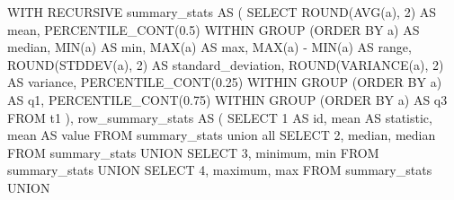 \documentclass[
  letterpaper,
  DIV=11,
  numbers=noendperiod]{scrreprt}
\newenvironment{Shaded}{\begin{snugshade}}{\end{snugshade}}
\newcommand{\DecValTok}[1]{\textcolor[rgb]{0.68,0.00,0.00}{#1}}
\newcommand{\FloatTok}[1]{\textcolor[rgb]{0.68,0.00,0.00}{#1}}
\newcommand{\FunctionTok}[1]{\textcolor[rgb]{0.28,0.35,0.67}{#1}}
\newcommand{\KeywordTok}[1]{\textcolor[rgb]{0.00,0.23,0.31}{#1}}
\newcommand{\NormalTok}[1]{\textcolor[rgb]{0.00,0.23,0.31}{#1}}
\newcommand{\OperatorTok}[1]{\textcolor[rgb]{0.37,0.37,0.37}{#1}}
\newcommand{\StringTok}[1]{\textcolor[rgb]{0.13,0.47,0.30}{#1}}
\begin{document}
\begin{Shaded}
\begin{Highlighting}[]
\KeywordTok{WITH}\NormalTok{ RECURSIVE}
\NormalTok{summary\_stats }\KeywordTok{AS}
\NormalTok{(}
 \KeywordTok{SELECT} 
  \FunctionTok{ROUND}\NormalTok{(}\FunctionTok{AVG}\NormalTok{(a), }\DecValTok{2}\NormalTok{) }\KeywordTok{AS}\NormalTok{ mean,}
  \FunctionTok{PERCENTILE\_CONT}\NormalTok{(}\FloatTok{0.5}\NormalTok{) WITHIN }\KeywordTok{GROUP}\NormalTok{ (}\KeywordTok{ORDER} \KeywordTok{BY}\NormalTok{ a) }\KeywordTok{AS} \FunctionTok{median}\NormalTok{,}
  \FunctionTok{MIN}\NormalTok{(a) }\KeywordTok{AS} \FunctionTok{min}\NormalTok{,}
  \FunctionTok{MAX}\NormalTok{(a) }\KeywordTok{AS} \FunctionTok{max}\NormalTok{,}
  \FunctionTok{MAX}\NormalTok{(a) }\OperatorTok{{-}} \FunctionTok{MIN}\NormalTok{(a) }\KeywordTok{AS} \KeywordTok{range}\NormalTok{,}
  \FunctionTok{ROUND}\NormalTok{(}\FunctionTok{STDDEV}\NormalTok{(a), }\DecValTok{2}\NormalTok{) }\KeywordTok{AS}\NormalTok{ standard\_deviation,}
  \FunctionTok{ROUND}\NormalTok{(}\FunctionTok{VARIANCE}\NormalTok{(a), }\DecValTok{2}\NormalTok{) }\KeywordTok{AS} \FunctionTok{variance}\NormalTok{,}
  \FunctionTok{PERCENTILE\_CONT}\NormalTok{(}\FloatTok{0.25}\NormalTok{) WITHIN }\KeywordTok{GROUP}\NormalTok{ (}\KeywordTok{ORDER} \KeywordTok{BY}\NormalTok{ a) }\KeywordTok{AS}\NormalTok{ q1,}
  \FunctionTok{PERCENTILE\_CONT}\NormalTok{(}\FloatTok{0.75}\NormalTok{) WITHIN }\KeywordTok{GROUP}\NormalTok{ (}\KeywordTok{ORDER} \KeywordTok{BY}\NormalTok{ a) }\KeywordTok{AS}\NormalTok{ q3}
   \KeywordTok{FROM}\NormalTok{ t1}
\NormalTok{),}
\NormalTok{row\_summary\_stats }\KeywordTok{AS}
\NormalTok{(}
\KeywordTok{SELECT} 
 \DecValTok{1} \KeywordTok{AS} \KeywordTok{id}\NormalTok{, }
 \StringTok{\textquotesingle{}mean\textquotesingle{}} \KeywordTok{AS}\NormalTok{ statistic, }
\NormalTok{ mean }\KeywordTok{AS} \FunctionTok{value} 
  \KeywordTok{FROM}\NormalTok{ summary\_stats}
\KeywordTok{union} \KeywordTok{all}
\KeywordTok{SELECT} 
 \DecValTok{2}\NormalTok{, }
 \StringTok{\textquotesingle{}median\textquotesingle{}}\NormalTok{, }
 \FunctionTok{median} 
  \KeywordTok{FROM}\NormalTok{ summary\_stats}
\KeywordTok{UNION}
\KeywordTok{SELECT} 
 \DecValTok{3}\NormalTok{, }
 \StringTok{\textquotesingle{}minimum\textquotesingle{}}\NormalTok{, }
 \FunctionTok{min} 
  \KeywordTok{FROM}\NormalTok{ summary\_stats}
\KeywordTok{UNION}
\KeywordTok{SELECT} 
 \DecValTok{4}\NormalTok{, }
 \StringTok{\textquotesingle{}maximum\textquotesingle{}}\NormalTok{, }
 \FunctionTok{max} 
  \KeywordTok{FROM}\NormalTok{ summary\_stats}
\KeywordTok{UNION}

\end{Highlighting}
\end{Shaded}
\end{document}
